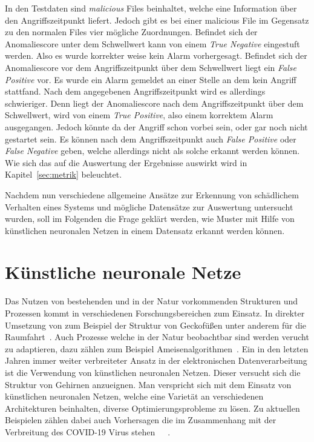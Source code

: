             In den Testdaten sind \textit{malicious}  Files beinhaltet, welche eine Information über den Angriffszeitpunkt liefert. 
            Jedoch gibt es bei einer malicious File im Gegensatz zu den normalen Files  vier mögliche Zuordnungen.
            Befindet sich der Anomaliescore unter dem Schwellwert kann von einem \textit{True Negative} eingestuft werden.
            Also es wurde korrekter weise kein Alarm vorhergesagt.
            Befindet sich der Anomaliescore vor dem Angriffszeitpunkt über dem Schwellwert liegt ein \textit{False Positive} vor.
            Es wurde ein Alarm gemeldet an einer Stelle an dem kein Angriff stattfand.
            Nach dem angegebenen Angriffszeitpunkt wird es allerdings schwieriger.
            Denn liegt der Anomaliescore nach dem Angriffszeitpunkt über dem Schwellwert, wird von einem \textit{True Positive}, also einem korrektem Alarm ausgegangen.
            Jedoch könnte da der Angriff schon vorbei sein, oder gar noch nicht gestartet sein.
            Es können nach dem Angriffszeitpunkt auch \textit{False Positive} oder \textit{False Negative} geben, welche allerdings nicht als solche erkannt werden können.
            Wie sich das auf die Auswertung der Ergebnisse auswirkt wird in Kapitel~\ref{sec:metrik} beleuchtet.

            Nachdem nun verschiedene allgemeine Ansätze zur Erkennung von schädlichem Verhalten eines Systems und mögliche Datensätze zur Auswertung untersucht wurden,
            soll im Folgenden die Frage geklärt werden, wie Muster mit Hilfe von künstlichen neuronalen Netzen in einem Datensatz erkannt werden können.

    \section{Künstliche neuronale Netze}
    \label{sec:KNN}        
        Das Nutzen von bestehenden und in der Natur vorkommenden Strukturen und Prozessen kommt in verschiedenen Forschungsbereichen zum Einsatz.
        In direkter Umsetzung von zum Beispiel der Struktur von Geckofüßen unter anderem für die Raumfahrt~\cite{GECKO}.%
        Auch Prozesse welche in der Natur beobachtbar sind werden verucht zu adaptieren, dazu zählen zum Beispiel Ameisenalgorithmen~\cite{ANT}.
        Ein in den letzten Jahren immer weiter verbreiteter Ansatz in der elektronischen Datenverarbeitung ist die Verwendung von künstlichen neuronalen Netzen.
        Dieser versucht sich die Struktur von Gehirnen anzueignen.
        Man verspricht sich mit dem Einsatz von künstlichen neuronalen Netzen, welche eine Varietät an verschiedenen Architekturen beinhalten, diverse Optimierungsprobleme zu lösen.
        Zu aktuellen Beispielen zählen dabei auch Vorhersagen die im Zusammenhang mit der Verbreitung des COVID-19 Virus stehen~\cite{COVID1}~\cite{COVID2}~\cite{COVID3}.
        
